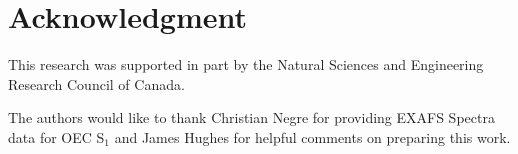 \documentclass[conference]{IEEEtran}
\begin{document}
%










\section*{Acknowledgment}

This research was supported in part by the Natural Sciences and Engineering Research Council of Canada.

The authors would like to thank Christian Negre for providing EXAFS Spectra data for OEC S$_{1}$ and James Hughes for helpful comments on preparing this work.

\end{document}
